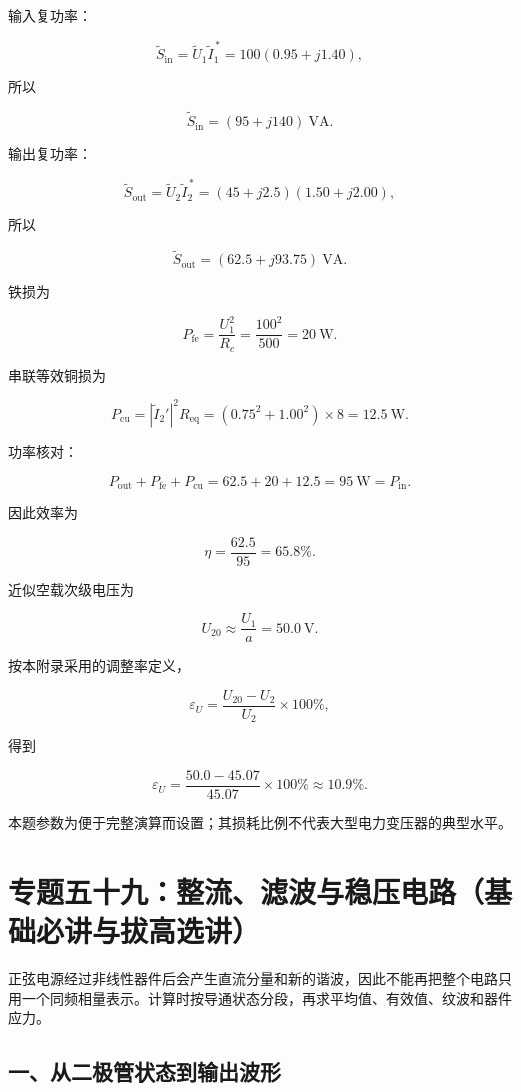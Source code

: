 输入复功率：

\[
\widetilde S_{\mathrm{in}}
=\widetilde U_1\widetilde I_1^{\,*}
=100(0.95+j1.40),
\]

所以

\[
\boxed{\widetilde S_{\mathrm{in}}
=(95+j140)\ \mathrm{VA}}.
\]

输出复功率：

\[
\widetilde S_{\mathrm{out}}
=\widetilde U_2\widetilde I_2^{\,*}
=(45+j2.5)(1.50+j2.00),
\]

所以

\[
\boxed{\widetilde S_{\mathrm{out}}
=(62.5+j93.75)\ \mathrm{VA}}.
\]

铁损为

\[
P_{\mathrm{fe}}
=\frac{U_1^2}{R_c}
=\frac{100^2}{500}
=20\ \mathrm W.
\]

串联等效铜损为

\[
P_{\mathrm{cu}}
=|\widetilde I_2'|^2R_{\mathrm{eq}}
=(0.75^2+1.00^2)\times8
=12.5\ \mathrm W.
\]

功率核对：

\[
P_{\mathrm{out}}+P_{\mathrm{fe}}+P_{\mathrm{cu}}
=62.5+20+12.5
=95\ \mathrm W
=P_{\mathrm{in}}.
\]

因此效率为

\[
\boxed{\eta
=\frac{62.5}{95}
=65.8\%}.
\]

近似空载次级电压为

\[
U_{20}\approx\frac{U_1}{a}
=50.0\ \mathrm V.
\]

按本附录采用的调整率定义，

\[
\varepsilon_U
=\frac{U_{20}-U_2}{U_2}\times100\%,
\]

得到

\[
\boxed{\varepsilon_U
=\frac{50.0-45.07}{45.07}\times100\%
\approx10.9\%}.
\]

本题参数为便于完整演算而设置；其损耗比例不代表大型电力变压器的典型水平。

\section{专题五十九：整流、滤波与稳压电路（基础必讲与拔高选讲）}\label{m6:ux4e13ux9898ux4e94ux5341ux4e5dux6574ux6d41ux6ee4ux6ce2ux4e0eux7a33ux538bux7535ux8defux57faux7840ux5fc5ux8bb2ux4e0eux62d4ux9ad8ux9009ux8bb2}

正弦电源经过非线性器件后会产生直流分量和新的谐波，因此不能再把整个电路只用一个同频相量表示。计算时按导通状态分段，再求平均值、有效值、纹波和器件应力。

\subsection{一、从二极管状态到输出波形}\label{m6:ux4e00ux4eceux4e8cux6781ux7ba1ux72b6ux6001ux5230ux8f93ux51faux6ce2ux5f62}


